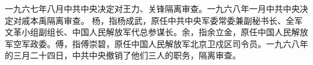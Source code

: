 \begin{maonote}
一九六七年八月中共中央决定对王力、关锋隔离审查。一九六八年一月中共中央决定对戚本禹隔离审查。
杨，指杨成武，原任中共中央军委常委兼副秘书长、全军文革小组副组长、中国人民解放军代总参谋长。余，指余立金，原任中国人民解放军空军政委。傅，指傅崇碧，原任中国人民解放军北京卫戍区司令员。一九六八年的三月二十四日，中共中央撤销了他们三人的职务，隔离审查。
\end{maonote}
